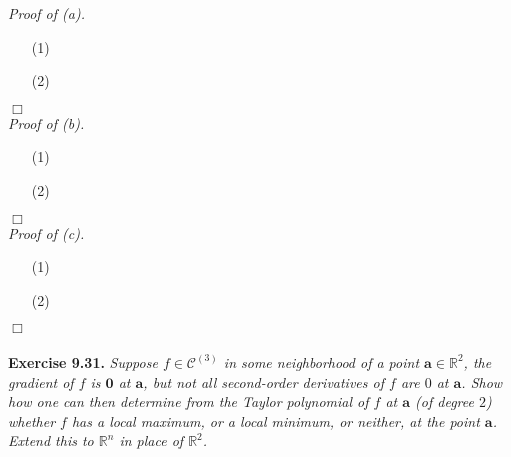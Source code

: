 \documentclass{article}
\begin{document}
\emph{Proof of (a).}
\begin{enumerate}
\item[(1)]
\item[(2)]

\end{enumerate}
$\Box$ \\



\emph{Proof of (b).}
\begin{enumerate}
\item[(1)]
\item[(2)]

\end{enumerate}
$\Box$ \\



\emph{Proof of (c).}
\begin{enumerate}
\item[(1)]
\item[(2)]

\end{enumerate}
$\Box$ \\\\






\textbf{Exercise 9.31.}
\emph{Suppose $f \in \mathscr{C}^{(3)}$ in some neighborhood of a point
$\mathbf{a} \in \mathbb{R}^2$,
the gradient of $f$ is $\mathbf{0}$ at $\mathbf{a}$,
but not all second-order derivatives of $f$ are $0$ at $\mathbf{a}$.
Show how one can then determine from the Taylor polynomial of $f$ at $\mathbf{a}$
(of degree $2$) whether $f$ has a local maximum,
or a local minimum, or neither, at the point $\mathbf{a}$.
Extend this to $\mathbb{R}^n$ in place of $\mathbb{R}^2$.} \\
\end{document}

